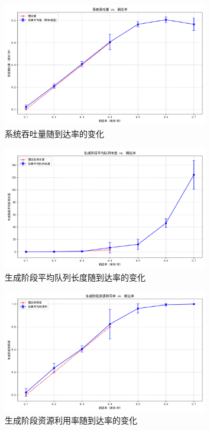 \documentclass[a4paper]{article}
\begin{document}
\begin{figure}[H]
    \centering
    \includegraphics[width=0.8\textwidth]{throughput_vs_arrival_rate.png}
    \caption{系统吞吐量随到达率的变化}
    \label{fig:throughput}
\end{figure}

\begin{figure}[H]
    \centering
    \includegraphics[width=0.8\textwidth]{generation_queue_length_vs_arrival_rate.png}
    \caption{生成阶段平均队列长度随到达率的变化}
    \label{fig:queue}
\end{figure}

\begin{figure}[H]
    \centering
    \includegraphics[width=0.8\textwidth]{generation_utilization_vs_arrival_rate.png}
    \caption{生成阶段资源利用率随到达率的变化}
    \label{fig:utilization}
\end{figure}
\end{document}
